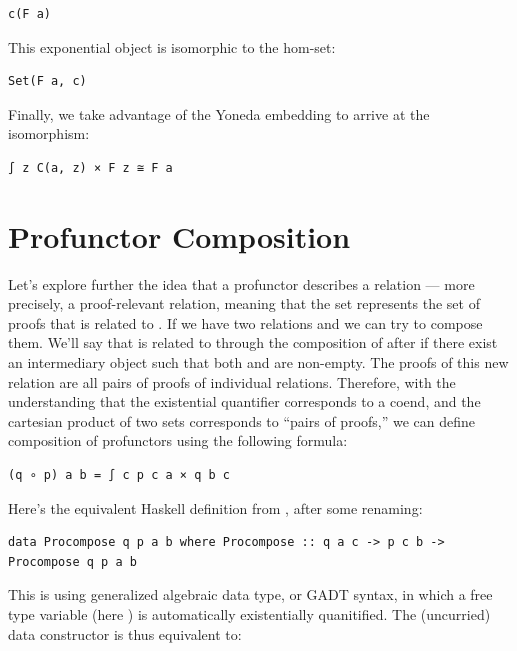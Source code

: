 \begin{verbatim}
c(F a)
\end{verbatim}

This exponential object is isomorphic to the hom-set:

\begin{verbatim}
Set(F a, c)
\end{verbatim}

Finally, we take advantage of the Yoneda embedding to arrive at the
isomorphism:

\begin{verbatim}
∫ z C(a, z) × F z ≅ F a
\end{verbatim}

\section{Profunctor Composition}\label{profunctor-composition}

Let's explore further the idea that a profunctor describes a relation
--- more precisely, a proof-relevant relation, meaning that the set
 represents the set of proofs that  is related
to . If we have two relations  and  we can
try to compose them. We'll say that  is related to 
through the composition of  after  if there exist an
intermediary object  such that both  and
 are non-empty. The proofs of this new relation are all
pairs of proofs of individual relations. Therefore, with the
understanding that the existential quantifier corresponds to a coend,
and the cartesian product of two sets corresponds to ``pairs of
proofs,'' we can define composition of profunctors using the following
formula:

\begin{verbatim}
(q ∘ p) a b = ∫ c p c a × q b c
\end{verbatim}

Here's the equivalent Haskell definition from
, after some renaming:

\begin{verbatim}
data Procompose q p a b where Procompose :: q a c -> p c b -> Procompose q p a b 
\end{verbatim}

This is using generalized algebraic data type, or GADT syntax, in which
a free type variable (here ) is automatically existentially
quanitified. The (uncurried) data constructor  is
thus equivalent to:


